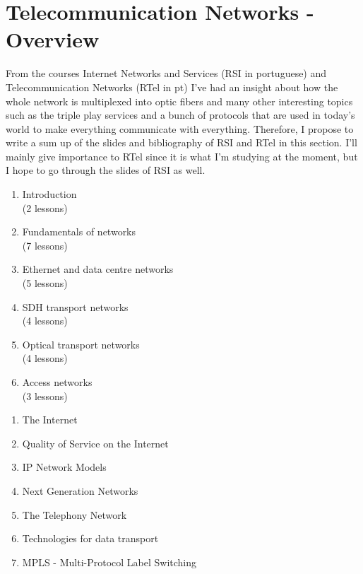 

\section{Telecommunication Networks - Overview}

From the courses Internet Networks and Services (RSI in portuguese) and Telecommunication Networks (RTel in pt) I've had an insight about how the whole network is multiplexed into optic fibers and many other interesting topics such as the triple play services and a bunch of protocols that are used in today's world to make everything communicate with everything. Therefore, I propose to write a sum up of the slides and bibliography of RSI and RTel in this section. I'll mainly give importance to RTel since it is what I'm studying at the moment, but I hope to go through the slides of RSI as well.

\begin{multicols}{2}
\begin{enumerate}
    \item Introduction \\(2 lessons)
    \item Fundamentals of networks \\(7 lessons)
    \item Ethernet and data centre networks \\(5 lessons)
    \item SDH transport networks \\(4 lessons)
    \item Optical transport networks \\(4 lessons)
    \item Access networks \\(3 lessons)
\end{enumerate}

\columnbreak

\begin{enumerate}
    \item The Internet
    \item Quality of Service on the Internet
    \item IP Network Models
    \item Next Generation Networks
    \item The Telephony Network
    \item Technologies for data transport
    \item MPLS - Multi-Protocol Label Switching
\end{enumerate}
\end{multicols}

